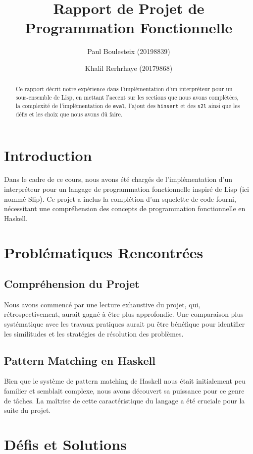 \documentclass[12pt]{article}
\title{Rapport de Projet de Programmation Fonctionnelle}
\author{Paul Boulesteix (20198839) \and Khalil Rerhrhaye (20179868)}
\date{}
\begin{document}
\maketitle

\begin{abstract}
Ce rapport décrit notre expérience dans l'implémentation d'un interpréteur pour un sous-ensemble de Lisp, en mettant l'accent sur les sections que nous avons complétées, la complexité de l'implémentation de \texttt{eval}, l'ajout des \texttt{hinsert} et des \texttt{s2l} ainsi que les défis et les choix que nous avons dû faire.
\end{abstract}

\section{Introduction}
Dans le cadre de ce cours, nous avons été chargés de l'implémentation d'un interpréteur pour un langage de programmation fonctionnelle inspiré de Lisp (ici nommé Slip). Ce projet a inclus la complétion d'un squelette de code fourni, nécessitant une compréhension des concepts de programmation fonctionnelle en Haskell.

\section{Problématiques Rencontrées}

\subsection{Compréhension du Projet}
Nous avons commencé par une lecture exhaustive du projet, qui, rétrospectivement, aurait gagné à être plus approfondie. Une comparaison plus systématique avec les travaux pratiques aurait pu être bénéfique pour identifier les similitudes et les stratégies de résolution des problèmes.

\subsection{Pattern Matching en Haskell}
Bien que le système de pattern matching de Haskell nous était initialement peu familier et semblait complexe, nous avons découvert sa puissance pour ce genre de tâches. La maîtrise de cette caractéristique du langage a été cruciale pour la suite du projet.

\section{Défis et Solutions}
\end{document}
